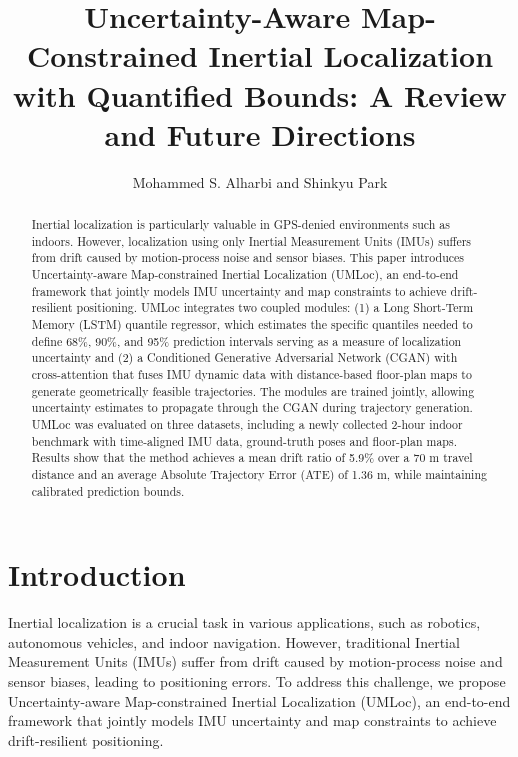 \documentclass{article}
\begin{document}
\title{Uncertainty-Aware Map-Constrained Inertial Localization with Quantified Bounds: A Review and Future Directions}

\author{Mohammed S. Alharbi and Shinkyu Park}

\maketitle

\begin{abstract}
Inertial localization is particularly valuable in GPS-denied environments such as indoors. However, localization using only Inertial Measurement Units (IMUs) suffers from drift caused by motion-process noise and sensor biases. This paper introduces Uncertainty-aware Map-constrained Inertial Localization (UMLoc), an end-to-end framework that jointly models IMU uncertainty and map constraints to achieve drift-resilient positioning. UMLoc integrates two coupled modules: (1) a Long Short-Term Memory (LSTM) quantile regressor, which estimates the specific quantiles needed to define 68\%, 90\%, and 95\% prediction intervals serving as a measure of localization uncertainty and (2) a Conditioned Generative Adversarial Network (CGAN) with cross-attention that fuses IMU dynamic data with distance-based floor-plan maps to generate geometrically feasible trajectories. The modules are trained jointly, allowing uncertainty estimates to propagate through the CGAN during trajectory generation. UMLoc was evaluated on three datasets, including a newly collected 2-hour indoor benchmark with time-aligned IMU data, ground-truth poses and floor-plan maps. Results show that the method achieves a mean drift ratio of 5.9\% over a 70 m travel distance and an average Absolute Trajectory Error (ATE) of 1.36 m, while maintaining calibrated prediction bounds.
\end{abstract}

\section{Introduction}
\label{sec:introduction}
Inertial localization is a crucial task in various applications, such as robotics, autonomous vehicles, and indoor navigation. However, traditional Inertial Measurement Units (IMUs) suffer from drift caused by motion-process noise and sensor biases, leading to positioning errors. To address this challenge, we propose Uncertainty-aware Map-constrained Inertial Localization (UMLoc), an end-to-end framework that jointly models IMU uncertainty and map constraints to achieve drift-resilient positioning.
\end{document}
